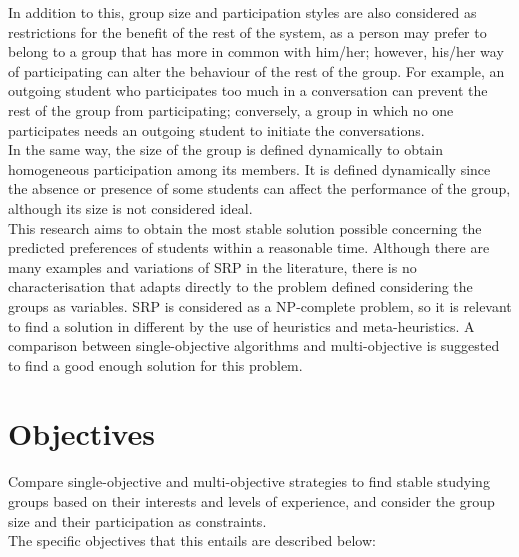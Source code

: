In addition to this, group size and participation styles are also considered as restrictions for the benefit of the rest of the system, as a person may prefer to belong to a group that has more in common with him/her; however, his/her way of participating can alter the behaviour of the rest of the group. For example, an outgoing student who participates too much in a conversation can prevent the rest of the group from participating; conversely, a group in which no one participates needs an outgoing student to initiate the conversations.\\

In the same way, the size of the group is defined dynamically to obtain homogeneous participation among its members. It is defined dynamically since the absence or presence of some students can affect the performance of the group, although its size is not considered ideal.\\

This research aims to obtain the most stable solution possible concerning the predicted preferences of students within a reasonable time. Although there are many examples and variations of SRP in the literature, there is no characterisation that adapts directly to the problem defined considering the groups as variables. SRP is considered as a NP-complete problem, so it is relevant to find a solution in different by the use of heuristics and meta-heuristics. A comparison between single-objective algorithms and multi-objective is suggested to find a good enough solution for this problem.

\section{Objectives}

Compare single-objective and multi-objective strategies to find stable studying groups based on their interests and levels of experience, and consider the group size and their participation as constraints.\\

The specific objectives that this entails are described below:

